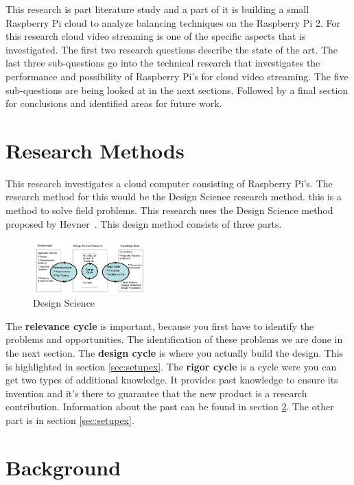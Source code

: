 \documentclass{sig-alternate-br}
\begin{document}
This research is part literature study and a part of it is building a small Raspberry Pi cloud to analyze balancing techniques on the Raspberry Pi 2. For this research cloud video streaming is one of the specific aspects that is investigated. The first two research questions describe the state of the art. The last three sub-questions go into the technical research that investigates the performance and possibility of Raspberry Pi's for cloud video streaming. The five sub-questions are being looked at in the next sections. Followed by a final section for conclusions and identified areas for future work.

\section{Research Methods}
This research investigates a cloud computer consisting of Raspberry Pi's. The research method for this would be the Design Science research method. this is a method to solve field problems. This research uses the Design Science method proposed by Hevner~\cite{hevner:2007}. This design method consists of three parts. 
\begin{figure}[H]
	\centering 
	\includegraphics[width=0.4\textwidth]{Design_science.png}
	\caption{Design Science}
	\label{fig:design} %
\end{figure}
The \textbf{relevance cycle} is important, because you first have to identify the problems and opportunities. The identification of these problems we are done in the next section. \newline The \textbf{design cycle} is where you actually build the design. This is highlighted in section \ref{sec:setupex}. \newline The \textbf{rigor cycle} is a cycle were you can get two types of additional knowledge. It provides past knowledge to ensure its invention and it's there to guarantee that the new product is a research contribution. Information about the past can be found in section \ref{sec:back}. The other part is in section \ref{sec:setupex}.



\section{Background}\label{sec:back}
\end{document}
